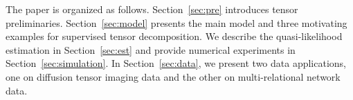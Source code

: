 \documentclass[12pt]{article}
\theoremstyle{definition}
\theoremstyle{definition}
\begin{document}
The paper is organized as follows. Section~\ref{sec:pre} introduces tensor preliminaries. Section~\ref{sec:model} presents the main model and three motivating examples for supervised tensor decomposition. 
We describe the quasi-likelihood estimation in Section~\ref{sec:est} and provide numerical experiments in Section~\ref{sec:simulation}. In Section~\ref{sec:data}, we present two data applications, one on diffusion tensor imaging data and the other on multi-relational network data.
\end{document}

